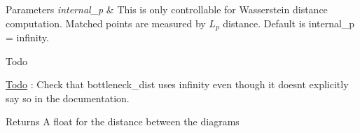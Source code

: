 \begin{DoxyParams}{Parameters}
{\em internal\+\_\+p} & This is only controllable for Wasserstein distance computation. Matched points are measured by $L_p$ distance. Default is internal\+\_\+p = infinity. \\
\hline
\end{DoxyParams}
\begin{DoxyRefDesc}{Todo}
\item[\hyperlink{todo__todo000005}{Todo}]\+: Check that bottleneck\+\_\+dist uses infinity even though it doesn\textquotesingle{}t explicitly say so in the documentation.\end{DoxyRefDesc}


\begin{DoxyReturn}{Returns}
A float for the distance between the diagrams 
\end{DoxyReturn}
